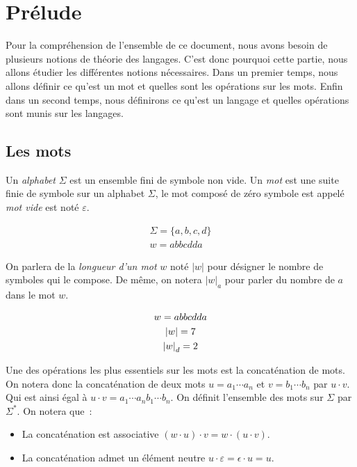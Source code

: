 \section{Prélude}

Pour la compréhension de l'ensemble de ce document, nous avons besoin de
plusieurs notions de théorie des langages. C'est donc pourquoi cette partie,
nous allons étudier les différentes notions nécessaires. Dans un premier temps,
nous allons définir ce qu'est un mot et quelles sont les opérations sur les
mots. Enfin dans un second temps, nous définirons ce qu'est un langage et
quelles opérations sont munis sur les langages.

\subsection{Les mots}

Un \textit{alphabet} \(\Sigma\) est un ensemble fini de symbole non vide. Un
\textit{mot} est une suite finie de symbole sur un alphabet \(\Sigma\), le mot
composé de zéro symbole est appelé \textit{mot vide} est noté \(\varepsilon\).

\begin{example}
    \begin{gather}
        \Sigma = \{a, b, c, d\} \\
        w = abbcdda
    \end{gather}
\end{example}

On parlera de la \textit{longueur d'un mot} \(w\) noté \(|w|\) pour désigner le
nombre de symboles qui le compose. De même, on notera \({|w|}_a\) pour parler
du nombre de \(a\) dans le mot \(w\).

\begin{example}
    \begin{gather}
        w = abbcdda \notag \\
        |w| = 7 \\
        {|w|}_d = 2
    \end{gather}
\end{example}

Une des opérations les plus essentiels sur les mots est la concaténation de
mots. On notera donc la concaténation de deux mots \(u = a_1 \cdots a_n\) et
\(v = b_1 \cdots b_n\) par \(u \cdot v\). Qui est ainsi égal à \(u \cdot v =
a_1 \cdots a_n b_1 \cdots b_n\). On définit l'ensemble des mots sur \(\Sigma\)
par \(\Sigma ^ *\). On notera que~:

\begin{itemize}[label=\textbullet]
    \item La concaténation est associative \((w \cdot u) \cdot v = w \cdot (u \cdot v)\).
    \item La concaténation admet un élément neutre \(u \cdot \varepsilon = \epsilon \cdot
          u = u\).
\end{itemize}

